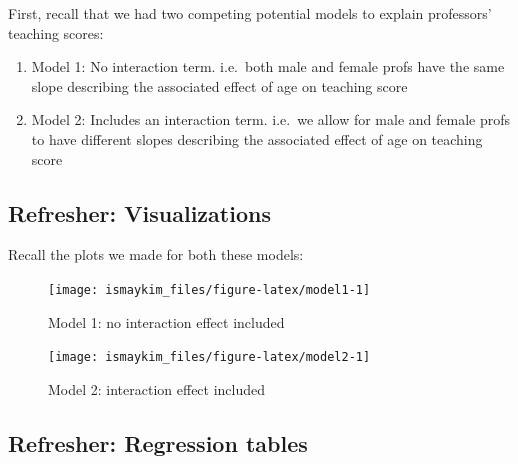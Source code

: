 \documentclass[12pt, krantz2,]{krantz}
\makeatletter
\newenvironment{Shaded}{\begin{snugshade}}{\end{snugshade}}
\newcommand{\KeywordTok}[1]{\textcolor[rgb]{0.27,0.27,0.27}{\textbf{#1}}}
\newcommand{\NormalTok}[1]{#1}
\newcommand{\OperatorTok}[1]{\textcolor[rgb]{0.43,0.43,0.43}{\textbf{#1}}}
\newcommand{\StringTok}[1]{\textcolor[rgb]{0.5,0.5,0.5}{#1}}
\providecommand{\tightlist}{%
  \setlength{\itemsep}{0pt}\setlength{\parskip}{0pt}}
\newenvironment{kframe}{%
\medskip{}
\setlength{\fboxsep}{.8em}
 \def\at@end@of@kframe{}%
 \ifinner\ifhmode%
  \def\at@end@of@kframe{\end{minipage}}%
  \begin{minipage}{\columnwidth}%
 \fi\fi%
 \def\FrameCommand##1{\hskip\@totalleftmargin \hskip-\fboxsep
 \colorbox{shadecolor}{##1}\hskip-\fboxsep
     \hskip-\linewidth \hskip-\@totalleftmargin \hskip\columnwidth}%
 \MakeFramed {\advance\hsize-\width
   \@totalleftmargin\z@ \linewidth\hsize
   \@setminipage}}%
 {\par\unskip\endMakeFramed%
 \at@end@of@kframe}
\renewenvironment{Shaded}{\begin{kframe}}{\end{kframe}}
\makeatother
\begin{document}
\begin{Shaded}
\end{Shaded}

First, recall that we had two competing potential models to explain professors'
teaching scores:

\begin{enumerate}
\def\labelenumi{\arabic{enumi}.}
\tightlist
\item
  Model 1: No interaction term. i.e.~both male and female profs have the same slope describing the associated effect of age on teaching score
\item
  Model 2: Includes an interaction term. i.e.~we allow for male and female profs to have different slopes describing the associated effect of age on teaching score
\end{enumerate}

\hypertarget{refresher-visualizations}{%
\subsection{Refresher: Visualizations}\label{refresher-visualizations}}

Recall the plots we made for both these models:

\begin{figure}

{\centering \texttt{[image: ismaykim\_files/figure-latex/model1-1]} 

}

\caption{Model 1: no interaction effect included}\label{fig:model1}
\end{figure}

\begin{figure}

{\centering \texttt{[image: ismaykim\_files/figure-latex/model2-1]} 

}

\caption{Model 2: interaction effect included}\label{fig:model2}
\end{figure}

\hypertarget{refresher-regression-tables}{%
\subsection{Refresher: Regression tables}\label{refresher-regression-tables}}
\end{document}
